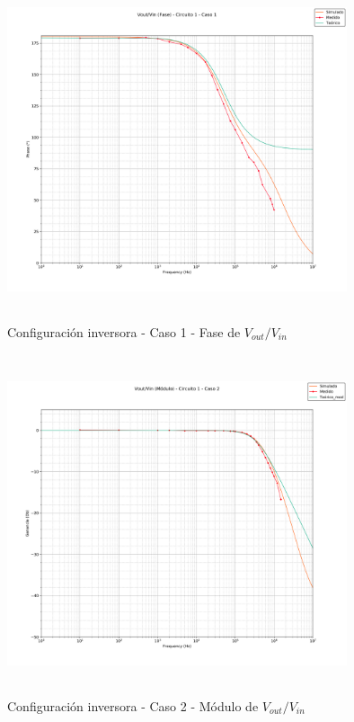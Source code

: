 \begin{figure}[H] %
	\centering
	\includegraphics[width=10cm,height=10cm,keepaspectratio]{../EJ1/00GRAFICOS/c1c1/c1c1voviFASE.png}
	\caption{Configuración inversora - Caso 1 - Fase de $V_{out}/V_{in}$}
	\label{c1c1voviP}
\end{figure}

\begin{figure}[H] %
	\centering
	\includegraphics[width=10cm,height=10cm,keepaspectratio]{../EJ1/00GRAFICOS/c1c2/c1c2voviMod.png}
	\caption{Configuración inversora - Caso 2 - Módulo de $V_{out}/V_{in}$}
	\label{c1c2voviM}
\end{figure}

